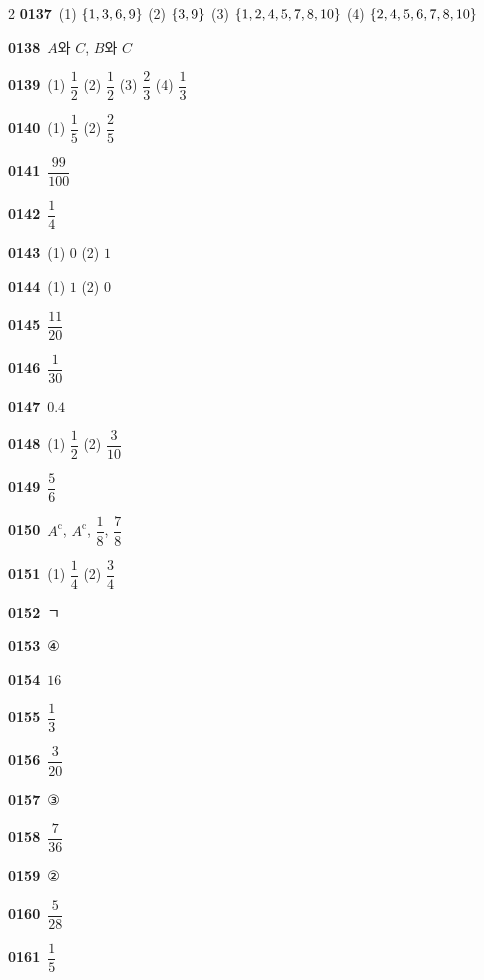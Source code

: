 \documentclass[10pt,a4paper]{article}
\newcommand{\comp}[1]{{#1}^{\mathrm{c}}}
\begin{document}
\begin{multicols}{2}
\noindent\textbf{0137}\ (1) $\{1{,}\mkern3mu\mathopen{}3{,}\mkern3mu\mathopen{}6{,}\mkern3mu\mathopen{}9\}$ (2) $\{3{,}\mkern3mu\mathopen{}9\}$ (3) $\{1{,}\mkern3mu\mathopen{}2{,}\mkern3mu\mathopen{}4{,}\mkern3mu\mathopen{}5{,}\mkern3mu\mathopen{}7{,}\mkern3mu\mathopen{}8{,}\mkern3mu\mathopen{}10\}$ (4) $\{2{,}\mkern3mu\mathopen{}4{,}\mkern3mu\mathopen{}5{,}\mkern3mu\mathopen{}6{,}\mkern3mu\mathopen{}7{,}\mkern3mu\mathopen{}8{,}\mkern3mu\mathopen{}10\}$\par
\noindent\textbf{0138}\ $A$와 $C$, $B$와 $C$\par
\noindent\textbf{0139}\ (1) $\dfrac{1}{2}$ (2) $\dfrac{1}{2}$ (3) $\dfrac{2}{3}$ (4) $\dfrac{1}{3}$\par
\noindent\textbf{0140}\ (1) $\dfrac{1}{5}$ (2) $\dfrac{2}{5}$\par
\noindent\textbf{0141}\ $\dfrac{99}{100}$\par
\noindent\textbf{0142}\ $\dfrac{1}{4}$\par
\noindent\textbf{0143}\ (1) $0$ (2) $1$\par
\noindent\textbf{0144}\ (1) $1$ (2) $0$\par
\noindent\textbf{0145}\ $\dfrac{11}{20}$\par
\noindent\textbf{0146}\ $\dfrac{1}{30}$\par
\noindent\textbf{0147}\ $0.4$\par
\noindent\textbf{0148}\ (1) $\dfrac{1}{2}$ (2) $\dfrac{3}{10}$\par
\noindent\textbf{0149}\ $\dfrac{5}{6}$\par
\noindent\textbf{0150}\ $\comp{A}$, $\comp{A}$, $\dfrac{1}{8}$, $\dfrac{7}{8}$\par
\noindent\textbf{0151}\ (1) $\dfrac{1}{4}$ (2) $\dfrac{3}{4}$\par
\noindent\textbf{0152}\ ㄱ\par
\noindent\textbf{0153}\ ④\par
\noindent\textbf{0154}\ $16$\par
\noindent\textbf{0155}\ $\dfrac{1}{3}$\par
\noindent\textbf{0156}\ $\dfrac{3}{20}$\par
\noindent\textbf{0157}\ ③\par
\noindent\textbf{0158}\ $\dfrac{7}{36}$\par
\noindent\textbf{0159}\ ②\par
\noindent\textbf{0160}\ $\dfrac{5}{28}$\par
\noindent\textbf{0161}\ $\dfrac{1}{5}$\par

\end{multicols}
\end{document}
